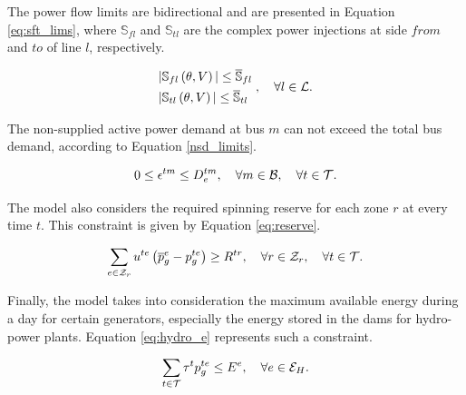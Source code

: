 The power flow limits are bidirectional and are presented in Equation \ref{eq:sft_lims}, where $\mathbb{S}_{fl}$ and $\mathbb{S}_{tl}$ are the complex power injections at side $from$ and $to$ of line $l$, respectively.

\begin{equation}
\begin{aligned}
&|\mathbb{S}_{fl}\left(\theta,V\right)| \le \overline{\mathbb{S}}_{fl}\\
&|\mathbb{S}_{tl}\left(\theta,V\right)| \le \overline{\mathbb{S}}_{tl}\\
\end{aligned} 
\;,\quad \forall l \in {\cal{L}}.
\label{eq:sft_lims}
\vspace{0.3cm}
\end{equation}

 The non-supplied active power demand at bus $m$ can not exceed the total bus demand, according to Equation \ref{nsd_limits}.
 
\begin{equation}
0 \le \epsilon^{tm} \le D^{tm}_{e}, \quad \forall m \in {\cal{B}}, \quad \forall t  \in {\cal{T}}.  
\label{nsd_limits}
\vspace{0.3cm}
\end{equation}

The model also considers the required spinning reserve for each zone $r$ at every time $t$. This constraint is given by Equation \ref{eq:reserve}.

\begin{equation}
\sum_{e \in {\cal{Z}}_{r}}{u^{te} \left( \overline{p}_{g}^{e} - p_{g}^{te} \right)} \ge R^{tr} ,\quad \forall r \in {\cal{Z}}_{r}, \quad \forall t  \in {\cal{T}}.
\label{eq:reserve}
\vspace{0.3cm}
\end{equation}

Finally, the model takes into consideration the maximum available energy during a day for certain generators, especially the energy stored in the dams for hydro-power plants. Equation \ref{eq:hydro_e} represents such a constraint.

\begin{equation}
\sum_{t \in {\cal{T}}}{{\tau}^{t} p_{g}^{te}} \le E^{e}, \quad \forall e \in {\cal{E}}_{H}
\label{eq:hydro_e}.
\vspace{0.3cm}
\end{equation}

\newpage